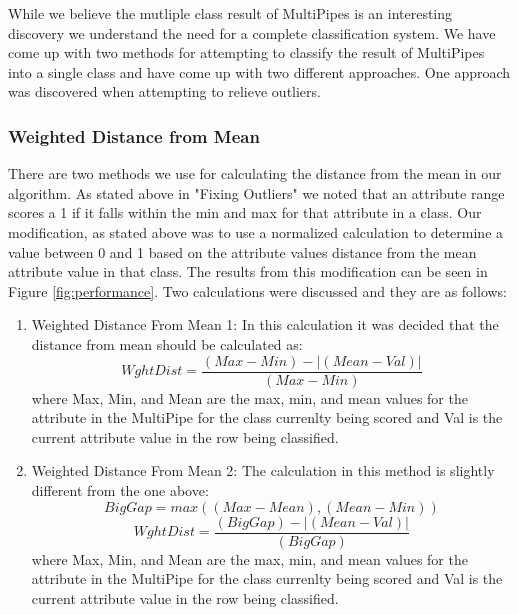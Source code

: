 While we believe the mutliple class result of MultiPipes is 
an interesting discovery we understand the need for a complete 
classification system. We have come up with two methods for
attempting to classify the result of MultiPipes into a single 
class and have come up with two different approaches. One 
approach was discovered when attempting to relieve outliers.
\subsubsection{Weighted Distance from Mean}
There are two methods we use for calculating the distance from 
the mean in our algorithm. As stated above in "Fixing Outliers" 
we noted that an attribute range scores a 1 if it falls within 
the min and max for that attribute in a class. Our modification, 
as stated above was to use a normalized calculation to determine 
a value between 0 and 1 based on the attribute values distance 
from the mean attribute value in that class. The results from this
 modification can be seen in Figure \ref{fig:performance}. Two 
calculations were discussed and they are as follows:
\begin{enumerate}
\item Weighted Distance From Mean 1: In this calculation it was 
decided that the distance from mean should be calculated as:
\begin{equation}
  WghtDist=\frac{(Max-Min)-|(Mean-Val)|}{(Max-Min)}
\end{equation}
where Max, Min, and Mean are the max, min, and mean values for 
the attribute in the MultiPipe for the class currenlty being 
scored and Val is the current attribute value in the row being 
classified. 
\item Weighted Distance From Mean 2: The calculation in this 
method is slightly different from the one above:
\begin{equation}
  BigGap = max((Max-Mean),(Mean-Min))
\end{equation}
\begin{equation}
  WghtDist=\frac{(BigGap)-|(Mean-Val)|}{(BigGap)}
\end{equation}
where Max, Min, and Mean are the max, min, and mean values for 
the attribute in the MultiPipe for the class currenlty being 
scored and Val is the current attribute value in the row being 
classified.
\end{enumerate}

